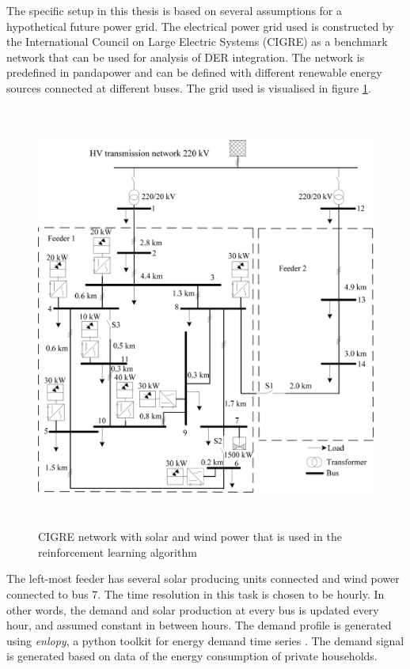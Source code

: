 \documentclass[class=book, crop=false]{standalone}
\begin{document}
The specific setup in this thesis is based on several assumptions for a hypothetical future power grid. The electrical power grid used is constructed by the International Council on Large Electric Systems (CIGRE) as a benchmark network that can be used for analysis of DER integration\cite{cigre}. The network is predefined in pandapower and can be defined with different renewable energy sources connected at different buses. The grid used is visualised in figure \ref{fig:problem:cigre_network}. 

\begin{figure}[ht]
    \includegraphics[height=14cm, width=13.5cm]{figures/cigre_network_mv_der.png}
    \caption[size = 9]{CIGRE network with solar and wind power that is used in the reinforcement learning algorithm}
    \label{fig:problem:cigre_network}
\end{figure}
The left-most feeder has several solar producing units connected and wind power connected to bus 7. The time resolution in this task is chosen to be hourly. In other words, the demand and solar production at every bus is updated every hour, and assumed constant in between hours. The demand profile is generated using \textit{enlopy}, a python toolkit for energy demand time series \cite{enlopy}. The demand signal is generated based on data of the energy consumption of private households.
\end{document}
